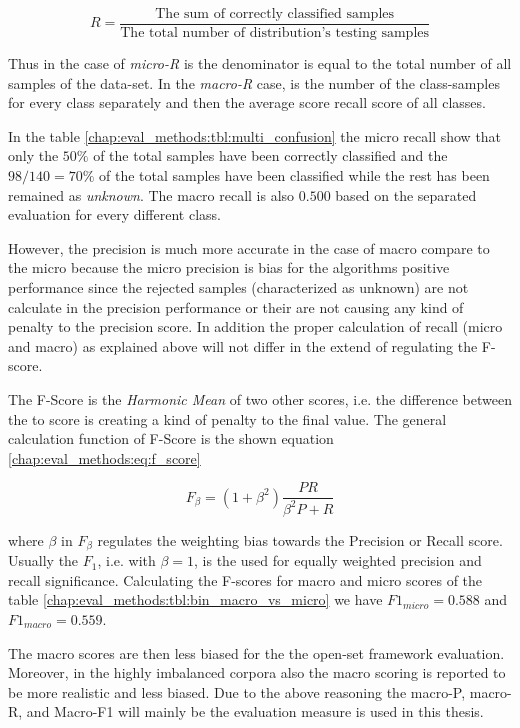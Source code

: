 \begin{equation}\label{chap:eval_methods:eq:recall_theory}
	R = \frac {\text{The sum of correctly classified samples}} {\text{The total number of distribution's testing samples}}
\end{equation}

Thus in the case of \textit{micro-R} is the denominator is equal to the total number of all samples of the data-set. In the \textit{macro-R} case, is the number of the class-samples for every class separately and then the average score recall score of all classes.

In the table \ref{chap:eval_methods:tbl:multi_confusion} the micro recall show that only the $50\%$ of the total samples have been correctly classified and the $98/140 = 70\%$ of the total samples have been classified while the rest has been remained as \textit{unknown}. The macro recall is also $0.500$ based on the separated evaluation for every different class.

However, the precision is much more accurate in the case of macro compare to the micro because the micro precision is bias for the algorithms positive performance since the rejected samples (characterized as unknown) are not calculate in the precision performance or their are not causing any kind of penalty to the precision score. In addition the proper calculation of recall (micro and macro) as explained above will not differ in the extend of regulating the F-score.

The F-Score is the \textit{Harmonic Mean} of two other scores, i.e. the difference between the to score is creating a kind of penalty to the final value. The general calculation function of F-Score is the shown equation \ref{chap:eval_methods:eq:f_score}

\begin{equation}\label{chap:eval_methods:eq:recall}
	F_{\beta} = (1 + \beta^{2}) \frac {P R} {\beta^{2} P + R}
\end{equation}

\noindent
where $\beta$ in $F_{\beta}$ regulates the weighting bias towards the Precision or Recall score. Usually the $F_{1}$, i.e. with $\beta = 1$, is the used for equally weighted precision and recall significance. Calculating the F-scores for macro and micro scores of the table \ref{chap:eval_methods:tbl:bin_macro_vs_micro} we have $F1_{micro} = 0.588$ and $F1_{macro} = 0.559$.

The macro scores are then less biased for the the open-set framework evaluation. Moreover, in the highly imbalanced corpora also the macro scoring is reported to be more realistic and less biased. Due to the above reasoning the macro-P, macro-R, and Macro-F1 will mainly be the evaluation measure is used in this thesis.

